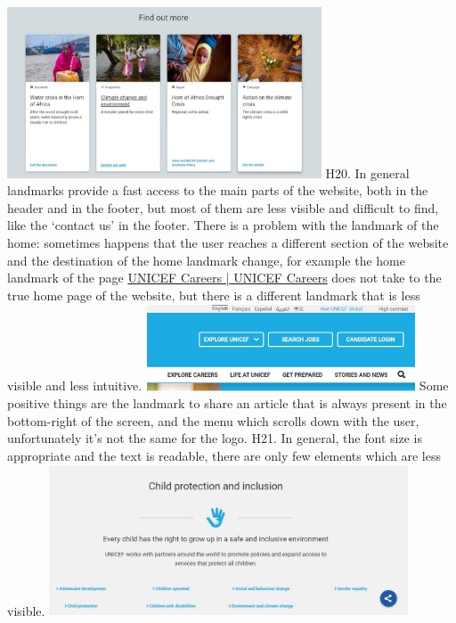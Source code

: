 \newline \includegraphics[width=0.7\textwidth]{FinalScores22.jpg}
\newline
\newline H20.	In general landmarks provide a fast access to the main parts of the website, both in the header and in the footer, but most of them are less visible and difficult to find, like the ‘contact us’ in the footer.
\newline There is a problem with the landmark of the home: sometimes happens that the user reaches a different section of the website and the destination of the home landmark change, for example the home landmark of the page \href{https://www.unicef.org/careers/}{UNICEF Careers | UNICEF Careers} does not take to the true home page of the website, but there is a different landmark that is less visible and less intuitive.
\newline \includegraphics[width=0.6\textwidth]{FinalScores23.jpg}
\newline Some positive things are the landmark to share an article that is always present in the bottom-right of the screen, and the menu which scrolls down with the user, unfortunately it’s not the same for the logo.
\newline
\newline H21.	In general, the font size is appropriate and the text is readable, there are only few elements which are less visible.
\newline \includegraphics[width=0.8\textwidth]{FinalScores24.jpg}
